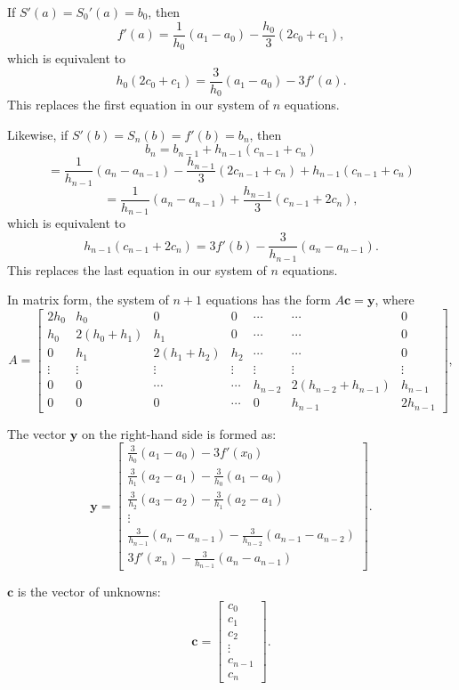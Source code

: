 \documentclass[a4paper]{article}
\begin{document}
\begin{sloppypar}
If \( S'(a) = S_0'(a) = b_0 \), then
\[ f'(a) = \frac{1}{h_0}(a_1 - a_0) - \frac{h_0}{3}(2c_0 + c_1), \]
which is equivalent to
\[ h_0(2c_0 + c_1) = \frac{3}{h_0}(a_1 - a_0) - 3f'(a). \]
This replaces the first equation in our system of \(n\) equations.

Likewise, if \( S'(b) = S_n(b) = f'(b) = b_n \), then
\[ b_n = b_{n-1} + h_{n-1}(c_{n-1} + c_n) \]
\[ = \frac{1}{h_{n-1}}(a_n - a_{n-1}) - \frac{h_{n-1}}{3}(2c_{n-1} + c_n) + h_{n-1}(c_{n-1} + c_n) \]
\[ = \frac{1}{h_{n-1}}(a_n - a_{n-1}) + \frac{h_{n-1}}{3}(c_{n-1} + 2c_n), \]
which is equivalent to
\[ h_{n-1}(c_{n-1} + 2c_n) = 3f'(b) - \frac{3}{h_{n-1}}(a_n - a_{n-1}). \]
This replaces the last equation in our system of \(n\) equations.

In matrix form, the system of $n+1$ equations has the form $A\mathbf{c} = \mathbf{y}$, where
\[ A = \begin{bmatrix}
2h_0 & h_0 & 0 & 0 & \cdots & \cdots& 0 \\
h_0 & 2(h_0 + h_1) & h_1 & 0 & \cdots & \cdots& 0 \\
0 & h_1 & 2(h_1 + h_2) & h_2 & \cdots & \cdots& 0 \\
\vdots & \vdots & \vdots & \vdots & \vdots &\vdots& \vdots \\
0 & 0 & \cdots & \cdots& h_{n-2} & 2(h_{n-2} + h_{n-1}) & h_{n-1} \\
0 & 0 & 0 & \cdots & 0& h_{n-1} & 2h_{n-1}
\end{bmatrix}, \]


The vector \(\mathbf{y}\) on the right-hand side is formed as:
\[
\mathbf{y} = \begin{bmatrix}
  \frac{3}{h_0}(a_1 - a_0) - 3f'(x_0) \\
  \frac{3}{h_1}(a_2 - a_1) - \frac{3}{h_0}(a_1 - a_0) \\
  \frac{3}{h_2}(a_3 - a_2) - \frac{3}{h_1}(a_2 - a_1) \\
  \vdots \\
  \frac{3}{h_{n-1}}(a_n - a_{n-1}) - \frac{3}{h_{n-2}}(a_{n-1} - a_{n-2}) \\
  3f'(x_n) - \frac{3}{h_{n-1}}(a_n - a_{n-1})
\end{bmatrix}.
\]

\(\mathbf{c}\) is the vector of unknowns:
\[
\mathbf{c} = \begin{bmatrix}
c_0 \\
c_1 \\
c_2 \\
\vdots \\
c_{n-1} \\
c_n
\end{bmatrix}.
\]


\end{sloppypar}
\end{document}
